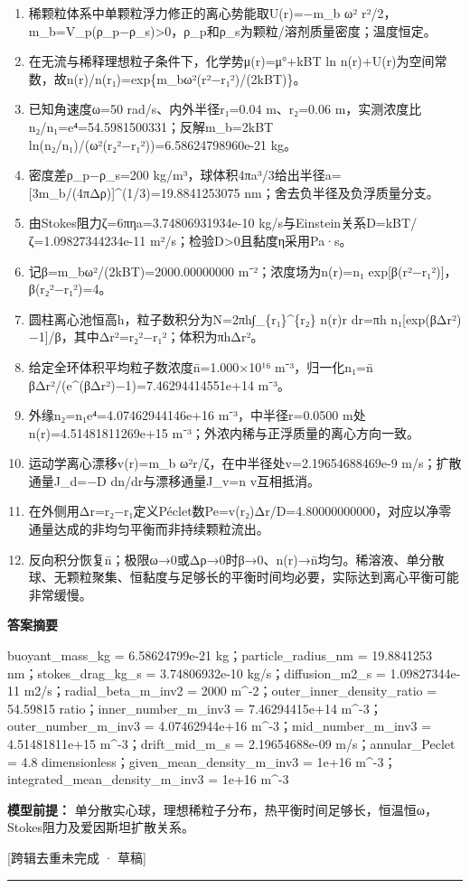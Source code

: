 \documentclass[UTF8,11pt,a4paper]{ctexart}
\begin{document}
\begin{enumerate}
\item 稀颗粒体系中单颗粒浮力修正的离心势能取U(r)=−m\_b ω² r²/2，m\_b=V\_p(ρ\_p−ρ\_s)>0，ρ\_p和ρ\_s为颗粒/溶剂质量密度；温度恒定。
\item 在无流与稀释理想粒子条件下，化学势μ(r)=μ°+kBT ln n(r)+U(r)为空间常数，故n(r)/n(r₁)=exp\{m\_bω²(r²−r₁²)/(2kBT)\}。
\item 已知角速度ω=50 rad/s、内外半径r₁=0.04 m、r₂=0.06 m，实测浓度比n₂/n₁=e⁴=54.5981500331；反解m\_b=2kBT ln(n₂/n₁)/(ω²(r₂²−r₁²))=6.58624798960e-21 kg。
\item 密度差ρ\_p−ρ\_s=200 kg/m³，球体积4πa³/3给出半径a=[3m\_b/(4πΔρ)]\textasciicircum{}(1/3)=19.8841253075 nm；舍去负半径及负浮质量分支。
\item 由Stokes阻力ζ=6πηa=3.74806931934e-10 kg/s与Einstein关系D=kBT/ζ=1.09827344234e-11 m²/s；检验D>0且黏度η采用Pa·s。
\item 记β=m\_bω²/(2kBT)=2000.00000000 m⁻²；浓度场为n(r)=n₁ exp[β(r²−r₁²)]，β(r₂²−r₁²)=4。
\item 圆柱离心池恒高h，粒子数积分为N=2πh∫\_\{r₁\}\textasciicircum{}\{r₂\} n(r)r dr=πh n₁[exp(βΔr²)−1]/β，其中Δr²=r₂²−r₁²；体积为πhΔr²。
\item 给定全环体积平均粒子数浓度n̄=1.000×10¹⁶ m⁻³，归一化n₁=n̄ βΔr²/(e\textasciicircum{}(βΔr²)−1)=7.46294414551e+14 m⁻³。
\item 外缘n₂=n₁e⁴=4.07462944146e+16 m⁻³，中半径r=0.0500 m处n(r)=4.51481811269e+15 m⁻³；外浓内稀与正浮质量的离心方向一致。
\item 运动学离心漂移v(r)=m\_b ω²r/ζ，在中半径处v=2.19654688469e-9 m/s；扩散通量J\_d=−D dn/dr与漂移通量J\_v=n v互相抵消。
\item 在外侧用Δr=r₂−r₁定义Péclet数Pe=v(r₂)Δr/D=4.80000000000，对应以净零通量达成的非均匀平衡而非持续颗粒流出。
\item 反向积分恢复n̄；极限ω→0或Δρ→0时β→0、n(r)→n̄均匀。稀溶液、单分散球、无颗粒聚集、恒黏度与足够长的平衡时间均必要，实际达到离心平衡可能非常缓慢。
\end{enumerate}
\noindent\textbf{答案摘要}\par
buoyant\_mass\_kg = 6.58624799e-21 kg；particle\_radius\_nm = 19.8841253 nm；stokes\_drag\_kg\_s = 3.74806932e-10 kg/s；diffusion\_m2\_s = 1.09827344e-11 m2/s；radial\_beta\_m\_inv2 = 2000 m\textasciicircum{}-2；outer\_inner\_density\_ratio = 54.59815 ratio；inner\_number\_m\_inv3 = 7.46294415e+14 m\textasciicircum{}-3；outer\_number\_m\_inv3 = 4.07462944e+16 m\textasciicircum{}-3；mid\_number\_m\_inv3 = 4.51481811e+15 m\textasciicircum{}-3；drift\_mid\_m\_s = 2.19654688e-09 m/s；annular\_Peclet = 4.8 dimensionless；given\_mean\_density\_m\_inv3 = 1e+16 m\textasciicircum{}-3；integrated\_mean\_density\_m\_inv3 = 1e+16 m\textasciicircum{}-3\par
\noindent\textbf{模型前提：}
单分散实心球，理想稀粒子分布，热平衡时间足够长，恒温恒ω，Stokes阻力及爱因斯坦扩散关系。\par
\noindent\textcolor{red!65!black}{[跨辑去重未完成 · 草稿]} \par
\medskip\hrule\medskip
{}
\end{document}
